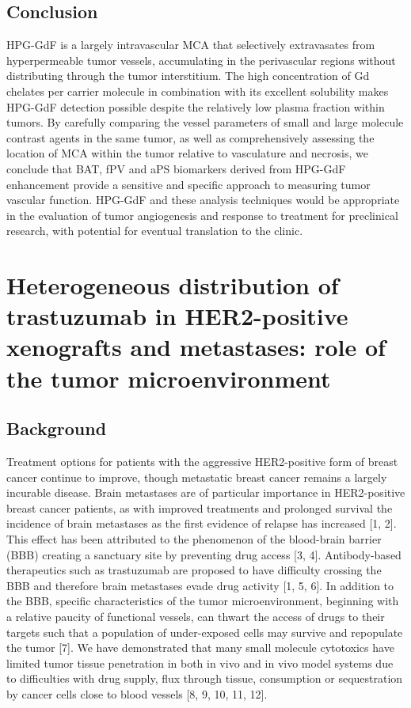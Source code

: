 \section{Conclusion}

HPG-GdF is a largely intravascular MCA that selectively extravasates from hyperpermeable tumor vessels, accumulating in the perivascular regions without distributing through the tumor interstitium.
The high concentration of Gd chelates per carrier molecule in combination with its excellent solubility makes HPG-GdF detection possible despite the relatively low plasma fraction within tumors.
By carefully comparing the vessel parameters of small and large molecule contrast agents in the same tumor, as well as comprehensively assessing the location of MCA within the tumor relative to vasculature and necrosis, we conclude that BAT, fPV and aPS biomarkers derived from HPG-GdF enhancement provide a sensitive and specific approach to measuring tumor vascular function.
HPG-GdF and these analysis techniques would be appropriate in the evaluation of tumor angiogenesis and response to treatment for preclinical research, with potential for eventual translation to the clinic.

%
%
%
%
%
%
%
%
%

\chapter{Heterogeneous distribution of trastuzumab in HER2-positive xenografts and metastases: role of the tumor microenvironment}
\label{ch:HPG2}

\section{Background}

Treatment options for patients with the aggressive HER2-positive form of breast cancer continue to improve, though metastatic breast cancer remains a largely incurable disease.
Brain metastases are of particular importance in HER2-positive breast cancer patients, as with improved treatments and prolonged survival the incidence of brain metastases as the first evidence of relapse has increased [1, 2].
This effect has been attributed to the phenomenon of the blood-brain barrier (BBB) creating a sanctuary site by preventing drug access [3, 4].
Antibody-based therapeutics such as trastuzumab are proposed to have difficulty crossing the BBB and therefore brain metastases evade drug activity [1, 5, 6].
In addition to the BBB, specific characteristics of the tumor microenvironment, beginning with a relative paucity of functional vessels, can thwart the access of drugs to their targets such that a population of under-exposed cells may survive and repopulate the tumor [7].
We have demonstrated that many small molecule cytotoxics have limited tumor tissue penetration in both in vivo and in vivo model systems due to difficulties with drug supply, flux through tissue, consumption or sequestration by cancer cells close to blood vessels [8, 9, 10, 11, 12].

